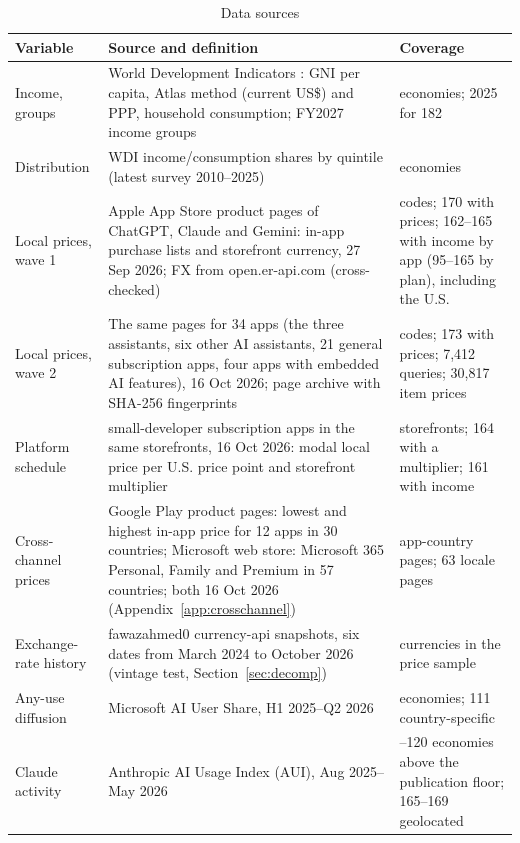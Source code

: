 \documentclass[11pt]{article}
\theoremstyle{definition}
\theoremstyle{remark}
\begin{document}
\begin{table}[t]
\centering
\begin{threeparttable}
\caption{Data sources}\label{tab:data}
\small
\begin{tabularx}{\textwidth}{@{}>{\raggedright\arraybackslash}p{3.1cm}>{\raggedright\arraybackslash}X>{\raggedright\arraybackslash}p{3.3cm}@{}}
\toprule
Variable & Source and definition & Coverage \\
\midrule
Income, groups & World Development Indicators \citep{worldbank2026wdi}: GNI per capita, Atlas method (current US\$) and PPP, household consumption; FY2027 income groups \citep{worldbank2026class} & 201 economies; 2025 for 182 \\
Distribution & WDI income/consumption shares by quintile (latest survey 2010--2025) & 163 economies \\
Local prices, wave 1 & Apple App Store product pages of ChatGPT, Claude and Gemini: in-app purchase lists and storefront currency, 27 Sep 2026; FX from open.er-api.com (cross-checked) & 218 codes; 170 with prices; 162--165 with income by app (95--165 by plan), including the U.S. \\
Local prices, wave 2 & The same pages for 34 apps (the three assistants, six other AI assistants, 21 general subscription apps, four apps with embedded AI features), 16 Oct 2026; page archive with SHA-256 fingerprints & 218 codes; 173 with prices; 7,412 queries; 30,817 item prices \\
Platform schedule & 30 small-developer subscription apps in the same storefronts, 16 Oct 2026: modal local price per U.S. price point and storefront multiplier & 167 storefronts; 164 with a multiplier; 161 with income \\
Cross-channel prices & Google Play product pages: lowest and highest in-app price for 12 apps in 30 countries; Microsoft web store: Microsoft 365 Personal, Family and Premium in 57 countries; both 16 Oct 2026 (Appendix~\ref{app:crosschannel}) & 360 app-country pages; 63 locale pages \\
Exchange-rate history & fawazahmed0 currency-api snapshots, six dates from March 2024 to October 2026 (vintage test, Section~\ref{sec:decomp}) & 37 currencies in the price sample \\
Any-use diffusion & Microsoft AI User Share, H1 2025--Q2 2026 \citep{misra2025measuring,microsoft2026q2} & 147 economies; 111 country-specific \\
Claude activity & Anthropic AI Usage Index (AUI), Aug 2025--May 2026 \citep{anthropic2026aei} & 113--120 economies above the publication floor; 165--169 geolocated \\

\end{tabularx}
\end{threeparttable}
\end{table}
\end{document}
